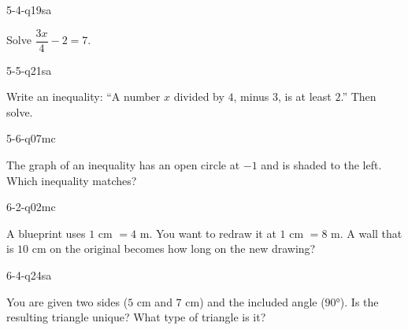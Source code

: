 \begin{practiceQuestion}{5-4-q19}{sa}
\begin{questionText}
Solve $\dfrac{3x}{4} - 2 = 7$.
\end{questionText}
\end{practiceQuestion}

\begin{practiceQuestion}{5-5-q21}{sa}
\begin{questionText}
Write an inequality: ``A number $x$ divided by $4$, minus $3$, is at least $2$.'' Then solve.
\end{questionText}
\end{practiceQuestion}

\begin{practiceQuestion}{5-6-q07}{mc}
\begin{questionText}
The graph of an inequality has an open circle at $-1$ and is shaded to the left. Which inequality matches?
\end{questionText}
\end{practiceQuestion}

\begin{practiceQuestion}{6-2-q02}{mc}
\begin{questionText}
A blueprint uses $1$ cm $= 4$ m. You want to redraw it at $1$ cm $= 8$ m. A wall that is $10$ cm on the original becomes how long on the new drawing?
\end{questionText}
\end{practiceQuestion}

\begin{practiceQuestion}{6-4-q24}{sa}
\begin{questionText}
You are given two sides ($5$ cm and $7$ cm) and the included angle ($90°$). Is the resulting triangle unique? What type of triangle is it?
\end{questionText}
\end{practiceQuestion}

